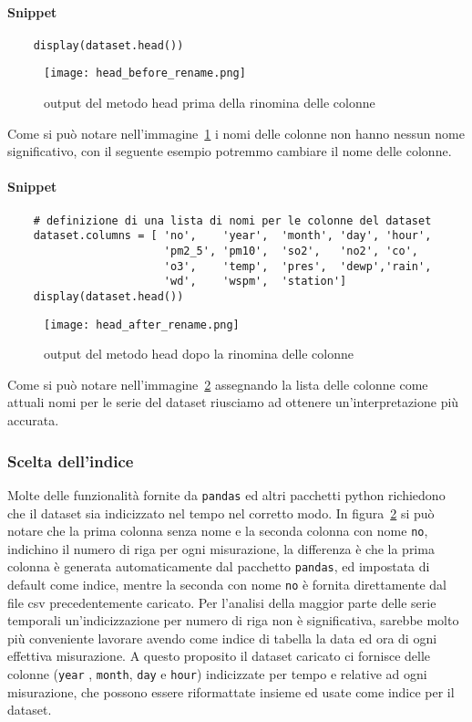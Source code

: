 \paragraph{Snippet}
\begin{verbatim}
    display(dataset.head())
\end{verbatim}
\begin{figure}[h!]
    \texttt{[image: head\_before\_rename.png]}
    \caption{output del metodo head prima della rinomina delle colonne}
    \label{fig:head_before_rename}
\end{figure}
Come si può notare nell'immagine~\ref*{fig:head_before_rename} i nomi delle colonne 
non hanno nessun nome significativo, con il seguente esempio potremmo
cambiare il nome delle colonne.

\paragraph{Snippet}
\begin{verbatim}
    # definizione di una lista di nomi per le colonne del dataset
    dataset.columns = [ 'no',    'year',  'month', 'day', 'hour', 
                        'pm2_5', 'pm10',  'so2',   'no2', 'co',  
                        'o3',    'temp',  'pres',  'dewp','rain',  
                        'wd',    'wspm',  'station']
    display(dataset.head())
\end{verbatim}
\begin{figure}[h!]
    \texttt{[image: head\_after\_rename.png]}
    \caption{output del metodo head dopo la rinomina delle colonne}
    \label{fig:head_after_rename}
\end{figure}
Come si può notare nell'immagine~\ref*{fig:head_after_rename}
assegnando la lista delle colonne come attuali nomi per le serie del dataset
riusciamo ad ottenere un'interpretazione più accurata.


\subsubsection{Scelta dell'indice}
Molte delle funzionalità fornite da \texttt{pandas} ed altri pacchetti python
richiedono che il dataset sia indicizzato nel tempo nel corretto modo.
In figura~\ref*{fig:head_after_rename} si può notare che la prima colonna
senza nome e la seconda colonna con nome \texttt{no}, indichino
il numero di riga per ogni misurazione, la differenza è che la prima colonna
è generata automaticamente dal pacchetto \texttt{pandas}, ed impostata
di default come indice, mentre la seconda con
nome \texttt{no} è fornita direttamente dal file csv precedentemente caricato.
Per l'analisi della maggior parte delle serie temporali un'indicizzazione per numero
di riga non è significativa, sarebbe molto più conveniente lavorare avendo
come indice di tabella la data ed ora di ogni effettiva misurazione.
A questo proposito il dataset caricato ci fornisce delle colonne (\texttt{year}
, \texttt{month}, \texttt{day} e \texttt{hour}) indicizzate per tempo e relative
ad ogni misurazione, che possono essere riformattate insieme ed usate come indice
per il dataset.

